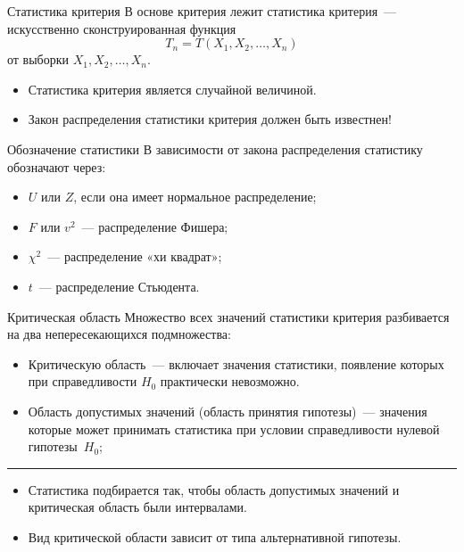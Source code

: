 \documentclass[unicode,11pt,notheorems,xcolor=table]{beamer}
\begin{document}
\begin{frame}{Статистика критерия}{}
    В основе критерия лежит \alert{статистика критерия}~---
    искусственно сконструированная функция
    $$
        T_n=T(X_1,X_2, \ldots, X_n)
    $$
    от выборки
    $X_1,X_2, \ldots, X_n$.

    \bigskip
    \begin{block}{}
        \begin{itemize}
            \item Статистика критерия  является случайной величиной.
            \item \alert{Закон распределения статистики критерия должен быть известнен!}
        \end{itemize}
    \end{block}

\end{frame}

\begin{frame}{Обозначение статистики}{}
    В зависимости от закона распределения статистику обозначают через: 
    \begin{itemize}
        \item $U$ или $Z$, если она имеет нормальное распределение; 
        \item $F$ или $v^2$~---  распределение Фишера; 
        \item $\chi^2$~--- распределение «хи квадрат»;  
        \item $t$~--- распределение Стьюдента.
    \end{itemize}
\end{frame}

\begin{frame}{Критическая область}{}
    Множество всех значений статистики критерия 
    разбивается на два непересекающихся подмножества:
    \begin{itemize}
        \item \alert{Критическую область}~--- включает значения статистики, появление которых при справедливости $H_0$ практически невозможно.
        \item \alert{Область допустимых значений (область принятия гипотезы)}~--- значения которые может принимать статистика при условии справедливости нулевой гипотезы~$H_0$;
    \end{itemize}

    \bigskip
    \hrule
    \bigskip

    \begin{itemize}
        \item  Статистика подбирается так, чтобы область допустимых значений и критическая область были интервалами.

        \item Вид критической области зависит от типа альтернативной гипотезы.
    \end{itemize}
\end{frame}
\end{document}
